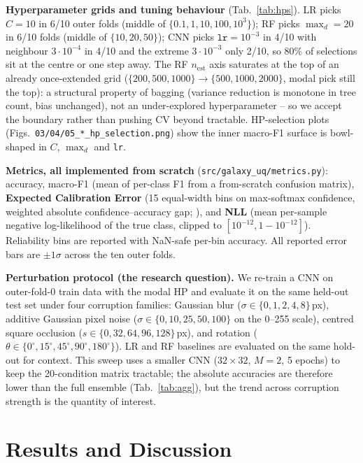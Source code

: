 \documentclass[10pt,a4paper]{article}
\begin{document}
\textbf{Hyperparameter grids and tuning behaviour} (Tab.~\ref{tab:hps}). LR picks $C{=}10$ in 6/10 outer folds (middle of $\{0.1,1,10,100,10^3\}$); RF picks $\max_d{=}20$ in 6/10 folds (middle of $\{10,20,50\}$); CNN picks $\texttt{lr}{=}10^{-3}$ in 4/10 with neighbour $3{\cdot}10^{-4}$ in 4/10 and the extreme $3{\cdot}10^{-3}$ only 2/10, so 80\% of selections sit at the centre or one step away. The RF $n_{\text{est}}$ axis saturates at the top of an already once-extended grid ($\{200,500,1000\}\!\to\!\{500,1000,2000\}$, modal pick still the top): a structural property of bagging (variance reduction is monotone in tree count, bias unchanged), not an under-explored hyperparameter -- so we accept the boundary rather than pushing CV beyond tractable. HP-selection plots (Figs.~\texttt{03/04/05\_*\_hp\_selection.png}) show the inner macro-F1 surface is bowl-shaped in $C$, $\max_d$ and \texttt{lr}.

\textbf{Metrics, all implemented from scratch} (\texttt{src/galaxy\_uq/metrics.py}): accuracy, macro-F1 (mean of per-class F1 from a from-scratch confusion matrix), \textbf{Expected Calibration Error} (15 equal-width bins on max-softmax confidence, weighted absolute confidence--accuracy gap; \citealp{guo2017}), and \textbf{NLL} (mean per-sample negative log-likelihood of the true class, clipped to $[10^{-12},1{-}10^{-12}]$). Reliability bins are reported with NaN-safe per-bin accuracy. All reported error bars are $\pm 1\sigma$ across the ten outer folds.

\textbf{Perturbation protocol (the research question).} We re-train a CNN on outer-fold-0 train data with the modal HP and evaluate it on the same held-out test set under four corruption families: Gaussian blur ($\sigma\!\in\!\{0,1,2,4,8\}$\,px), additive Gaussian pixel noise ($\sigma\!\in\!\{0,10,25,50,100\}$ on the 0--255 scale), centred square occlusion ($s\!\in\!\{0,32,64,96,128\}$\,px), and rotation ($\theta\!\in\!\{0^\circ,15^\circ,45^\circ,90^\circ,180^\circ\}$). LR and RF baselines are evaluated on the same hold-out for context. This sweep uses a smaller CNN ($32\!\times\!32$, $M{=}2$, 5 epochs) to keep the 20-condition matrix tractable; the absolute accuracies are therefore lower than the full ensemble (Tab.~\ref{tab:agg}), but the trend across corruption strength is the quantity of interest.

\section{Results and Discussion}
\end{document}
